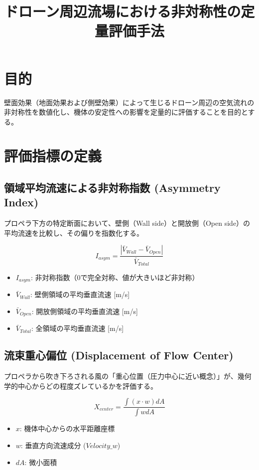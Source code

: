 \documentclass[a4paper,11pt]{jsarticle} %
\title{ドローン周辺流場における非対称性の定量評価手法}
\author{}
\date{}
\begin{document}
\maketitle

\section{目的}
壁面効果（地面効果および側壁効果）によって生じるドローン周辺の空気流れの非対称性を数値化し、機体の安定性への影響を定量的に評価することを目的とする。

\section{評価指標の定義}

\subsection{領域平均流速による非対称指数 (Asymmetry Index)}
プロペラ下方の特定断面において、壁側（Wall side）と開放側（Open side）の平均流速を比較し、その偏りを指数化する。

\begin{equation}
  I_{asym} = \frac{|\bar{V}_{Wall} - \bar{V}_{Open}|}{\bar{V}_{Total}}
\end{equation}

\begin{itemize}
  \item $I_{asym}$: 非対称指数（0で完全対称、値が大きいほど非対称）
  \item $\bar{V}_{Wall}$: 壁側領域の平均垂直流速 [m/s]
  \item $\bar{V}_{Open}$: 開放側領域の平均垂直流速 [m/s]
  \item $\bar{V}_{Total}$: 全領域の平均垂直流速 [m/s]
\end{itemize}

\subsection{流束重心偏位 (Displacement of Flow Center)}
プロペラから吹き下ろされる風の「重心位置（圧力中心に近い概念）」が、幾何学的中心からどの程度ズレているかを評価する。

\begin{equation}
  X_{center} = \frac{\int (x \cdot w) dA}{\int w dA}
\end{equation}

\begin{itemize}
  \item $x$: 機体中心からの水平距離座標
  \item $w$: 垂直方向流速成分 ($Velocity\_w$)
  \item $dA$: 微小面積
\end{itemize}
\end{document}
